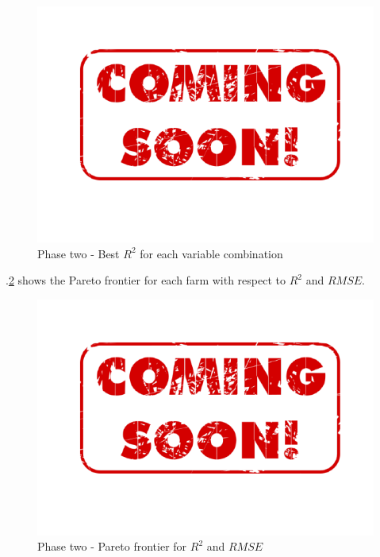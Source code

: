 \documentclass[review]{elsarticle}
\begin{document}
\begin{figure}[H] 
 \centering
 \includegraphics[scale=.5]{coming}
 \caption{Phase two - Best $R^2$ for each variable combination} 
 \label{figura10} 
\end{figure}

\figurename $.$\ref{figura11} shows the Pareto frontier for each farm with respect to $R^2$ and $RMSE$. 

\begin{figure}[H] 
 \centering
 \includegraphics[scale=.8]{coming}
 \caption{Phase two - Pareto frontier for $R^2$ and $RMSE$} 
 \label{figura11} 
\end{figure}
\end{document}
